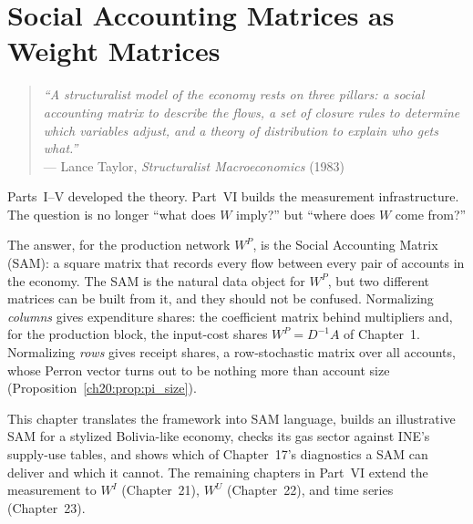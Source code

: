 \documentclass[../structural_economics_book.tex]{subfiles}
\begin{document}
\ifSubfilesClassLoaded{\setcounter{chapter}{19}}{}
\chapter{Social Accounting Matrices as Weight Matrices}\label{ch:20}
\begin{quote}
\textit{``A structuralist model of the economy rests on three pillars: a social accounting matrix to describe the flows, a set of closure rules to determine which variables adjust, and a theory of distribution to explain who gets what.''}\\
\hfill --- Lance Taylor, \textit{Structuralist Macroeconomics} (1983)
\end{quote}
\nocite{taylor1983structuralist}

\vspace{1em}

Parts~I--V developed the theory. Part~VI builds the measurement infrastructure. The question is no longer ``what does $W$ imply?'' but ``where does $W$ come from?''

The answer, for the production network $W^P$, is the Social Accounting Matrix (SAM): a square matrix that records every flow between every pair of accounts in the economy. The SAM is the natural data object for $W^P$, but two different matrices can be built from it, and they should not be confused. Normalizing \emph{columns} gives expenditure shares: the coefficient matrix behind multipliers and, for the production block, the input-cost shares $W^P = D^{-1}A$ of Chapter~1. Normalizing \emph{rows} gives receipt shares, a row-stochastic matrix over all accounts, whose Perron vector turns out to be nothing more than account size (Proposition~\ref{ch20:prop:pi_size}).

This chapter translates the framework into SAM language, builds an illustrative SAM for a stylized Bolivia-like economy, checks its gas sector against INE's supply-use tables, and shows which of Chapter~17's diagnostics a SAM can deliver and which it cannot. The remaining chapters in Part~VI extend the measurement to $W^I$ (Chapter~21), $W^U$ (Chapter~22), and time series (Chapter~23).


\end{document}

